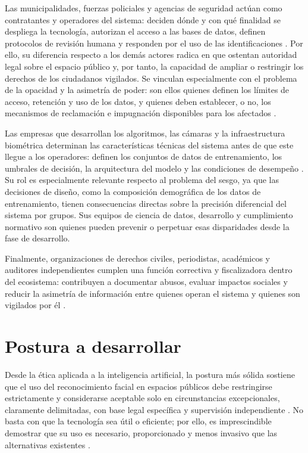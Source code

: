 \documentclass[11pt, a4paper]{article}
\begin{document}
Las municipalidades, fuerzas policiales y agencias de seguridad actúan como contratantes y operadores del sistema: deciden dónde y con qué finalidad se despliega la tecnología, autorizan el acceso a las bases de datos, definen protocolos de revisión humana y responden por el uso de las identificaciones \citep{gimenez2022, gikay2023}. Por ello, su diferencia respecto a los demás actores radica en que ostentan autoridad legal sobre el espacio público y, por tanto, la capacidad de ampliar o restringir los derechos de los ciudadanos vigilados. Se vinculan especialmente con el problema de la opacidad y la asimetría de poder: son ellos quienes definen los límites de acceso, retención y uso de los datos, y quienes deben establecer, o no, los mecanismos de reclamación e impugnación disponibles para los afectados \citep{martinez2024, silva2020}.

Las empresas que desarrollan los algoritmos, las cámaras y la infraestructura biométrica determinan las características técnicas del sistema antes de que este llegue a los operadores: definen los conjuntos de datos de entrenamiento, los umbrales de decisión, la arquitectura del modelo y las condiciones de desempeño \citep{martinez2024, gikay2023}. Su rol es especialmente relevante respecto al problema del sesgo, ya que las decisiones de diseño, como la composición demográfica de los datos de entrenamiento, tienen consecuencias directas sobre la precisión diferencial del sistema por grupos. Sus equipos de ciencia de datos, desarrollo y cumplimiento normativo son quienes pueden prevenir o perpetuar esas disparidades desde la fase de desarrollo.

Finalmente, organizaciones de derechos civiles, periodistas, académicos y auditores independientes cumplen una función correctiva y fiscalizadora dentro del ecosistema: contribuyen a documentar abusos, evaluar impactos sociales y reducir la asimetría de información entre quienes operan el sistema y quienes son vigilados por él \citep{schmechel2021, laux2024}.

\section{Postura a desarrollar}

Desde la ética aplicada a la inteligencia artificial, la postura más sólida sostiene que el uso del reconocimiento facial en espacios públicos debe restringirse estrictamente y considerarse aceptable solo en circunstancias excepcionales, claramente delimitadas, con base legal específica y supervisión independiente \citep{gimenez2022, gikay2023}. No basta con que la tecnología sea útil o eficiente; por ello, es imprescindible demostrar que su uso es necesario, proporcionado y menos invasivo que las alternativas existentes \citep{gimenez2022, ploeg2003}.
\end{document}

